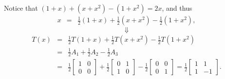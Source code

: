 \documentclass[pdf,9pt]{beamer}
\begin{document}
\begin{frame}[fragile]
    \begin{solution}
    Notice that $(1+x)+(x+x^2)-(1+x^2)=2x$, and thus
    \begin{eqnarray*}
	x & = & \textstyle \frac{1}{2}(1+x) +\frac{1}{2}(x+x^2)-\frac{1}{2}(1+x^2),
    \end{eqnarray*}
    \[\Downarrow\]
    \begin{eqnarray*}
	T(x)& = & \textstyle \frac{1}{2} T(1+x) +\frac{1}{2}T(x+x^2)
	-\frac{1}{2}T(1+x^2) \\
	    & = & \textstyle \frac{1}{2}A_1 +\frac{1}{2}A_2 -\frac{1}{2}A_3\\
	    & = & \textstyle
	\frac{1}{2} \left[\begin{array}{rr} 1 & 0 \\ 0 & 0 \end{array}\right]
	+\frac{1}{2}
	\left[\begin{array}{rr} 0 & 1 \\ 1 & 0 \end{array}\right]
	-\frac{1}{2}
	\left[\begin{array}{rr} 0 & 0 \\ 0 & 1 \end{array}\right]
	=\textstyle\frac{1}{2}\left[\begin{array}{rr} 1 & 1 \\ 1 & -1 \end{array}\right].
    \end{eqnarray*}
\end{solution}
\end{frame}
\end{document}
